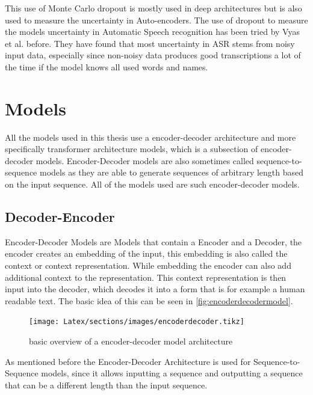 This use of Monte Carlo dropout is mostly used in deep architectures but is also used to measure the uncertainty in Auto-encoders. \cite{gawlikowski2022surveyuncertaintydeepneural}
The use of dropout to measure the models uncertainty in Automatic Speech recognition has been tried by Vyas et al. \cite{8683086} before.
They have found that most uncertainty in ASR stems from noisy input data, especially since non-noisy data produces good transcriptions a lot of the time if the model knows all used words and names. 

\section{Models}
\label{ch:models}
All the models used in this thesis use a encoder-decoder architecture and more specifically transformer architecture models, which is a subsection of encoder-decoder models. Encoder-Decoder models are also sometimes called sequence-to-sequence models as they are able to generate sequences of arbitrary length based on the input sequence.
All of the models used are such encoder-decoder models. 

\subsection{Decoder-Encoder}

Encoder-Decoder Models are Models that contain a Encoder and a Decoder, the encoder creates an embedding of the input, this embedding is also called the context or context representation. While embedding the encoder can also add additional context to the representation. 
This context representation is then input into the decoder, which decodes it into a form that is for example a human readable text. 
The basic idea of this can be seen in \autoref{fig:encoderdecodermodel}.
\begin{figure}[ht]
    \centering%
    \texttt{[image: Latex/sections/images/encoderdecoder.tikz]}
    \caption{basic overview of a encoder-decoder model architecture}
    \label{fig:encoderdecodermodel}
\end{figure}

As mentioned before the Encoder-Decoder Architecture is used for Sequence-to-Sequence models, since it allows inputting a sequence and outputting a sequence that can be a different length than the input sequence. \cite[chapter~8.7]{jm3}

